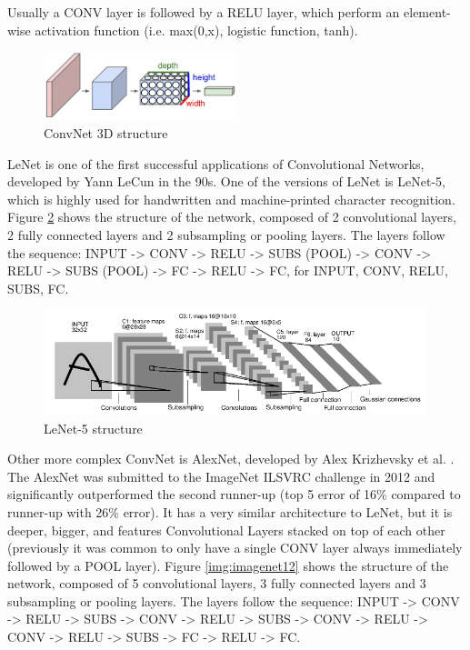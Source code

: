 \documentclass[]{article}
\begin{document}
Usually a CONV layer is followed by a RELU layer, which perform an element-wise activation function (i.e. max(0,x), logistic function, tanh).

\begin{figure}[htpb!]
\centering
\includegraphics[width= 0.5\textwidth]{images/cnn}
\caption{ConvNet 3D structure \cite{cs231convnets}\label{img:cnn}}
\end{figure}

LeNet is one of the first successful applications of Convolutional Networks, developed by Yann LeCun in the 90s. One of the versions of LeNet is LeNet-5, which is highly used for handwritten and machine-printed character recognition. Figure \ref{img:lenet5} shows the structure of the network, composed of 2 convolutional layers, 2 fully connected layers and 2 subsampling or pooling layers. The layers follow the sequence: INPUT -> CONV -> RELU -> SUBS (POOL) -> CONV -> RELU -> SUBS (POOL) -> FC -> RELU -> FC, for INPUT, CONV, RELU, SUBS, FC. %
\begin{figure}[htpb!]
\centering
\includegraphics[width= 0.99\textwidth]{images/lenet5}
\caption{LeNet-5 structure \cite{Lecun98} \label{img:lenet5}}
\end{figure}

Other more complex ConvNet is AlexNet, developed by Alex Krizhevsky et al. \cite{Krizhevsky12}. The AlexNet was submitted to the ImageNet ILSVRC challenge in 2012 and significantly outperformed the second runner-up (top 5 error of 16\% compared to runner-up with 26\% error). It has a very similar architecture to LeNet, but it is  deeper, bigger, and features Convolutional Layers stacked on top of each other (previously it was common to only have a single CONV layer always immediately followed by a POOL layer)\cite{cs231convnets}. Figure \ref{img:imagenet12} shows the structure of the network, composed of 5 convolutional layers, 3 fully connected layers and 3 subsampling or pooling layers. The layers follow the sequence: INPUT -> CONV -> RELU -> SUBS -> CONV -> RELU -> SUBS -> CONV -> RELU -> CONV -> RELU -> SUBS -> FC -> RELU -> FC. %
\end{document}
